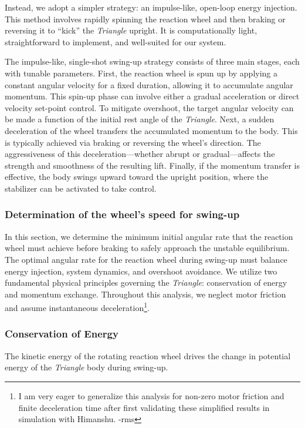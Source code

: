 \documentclass{article}
\begin{document}
Instead, we adopt a simpler strategy: an impulse-like, open-loop energy injection. This method involves rapidly spinning the reaction wheel and then braking or reversing it to ``kick'' the \textit{Triangle} upright. It is computationally light, straightforward to implement, and well-suited for our system.

The impulse-like, single-shot swing-up strategy consists of three main stages, each with tunable parameters. First, the reaction wheel is spun up by applying a constant angular velocity for a fixed duration, allowing it to accumulate angular momentum. This spin-up phase can involve either a gradual acceleration or direct velocity set-point control. To mitigate overshoot, the target angular velocity can be made a function of the initial rest angle of the \textit{Triangle}. Next, a sudden deceleration of the wheel transfers the accumulated momentum to the body. This is typically achieved via braking or reversing the wheel's direction. The aggressiveness of this deceleration—whether abrupt or gradual—affects the strength and smoothness of the resulting lift. Finally, if the momentum transfer is effective, the body swings upward toward the upright position, where the stabilizer can be activated to take control.

\subsubsection{Determination of the wheel's speed for swing-up}

In this section, we determine the minimum initial angular rate that the reaction wheel must achieve before braking to safely approach the unstable equilibrium. The optimal angular rate for the reaction wheel during swing-up must balance energy injection, system dynamics, and overshoot avoidance. We utilize two fundamental physical principles governing the \textit{Triangle}: conservation of energy and momentum exchange. Throughout this analysis, we neglect motor friction and assume instantaneous deceleration\footnote{I am very eager to generalize this analysis for non-zero motor friction and finite deceleration time after first validating these simplified results in simulation with Himanshu. -rms}.

\subsubsection*{Conservation of Energy}

The kinetic energy of the rotating reaction wheel drives the change in potential energy of the \textit{Triangle} body during swing-up.
\end{document}
